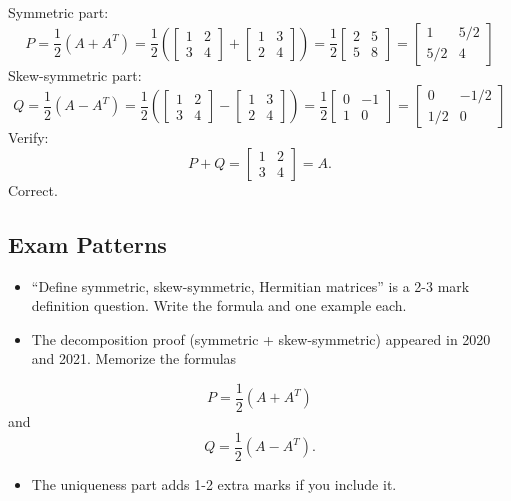 \documentclass[
]{article}
\providecommand{\tightlist}{%
  \setlength{\itemsep}{0pt}\setlength{\parskip}{0pt}}
\begin{document}
Symmetric part:
\[
P = \frac{1}{2}(A + A^T) = \frac{1}{2}\left(
\begin{bmatrix}
1 & 2 \\
3 & 4
\end{bmatrix} + \begin{bmatrix} 1 & 3 \\ 2 & 4 \end{bmatrix}\right) = \frac{1}{2}\begin{bmatrix} 2 & 5 \\ 5 & 8 \end{bmatrix} = \begin{bmatrix} 1 & 5/2 \\ 5/2 & 4 \end{bmatrix}
\]
Skew-symmetric part:
\[
Q = \frac{1}{2}(A - A^T) = \frac{1}{2}\left(
\begin{bmatrix}
1 & 2 \\
3 & 4
\end{bmatrix} - \begin{bmatrix} 1 & 3 \\ 2 & 4 \end{bmatrix}\right) = \frac{1}{2}\begin{bmatrix} 0 & -1 \\ 1 & 0 \end{bmatrix} = \begin{bmatrix} 0 & -1/2 \\ 1/2 & 0 \end{bmatrix}
\]
Verify:
\[
P + Q =
\begin{bmatrix}
1 & 2 \\
3 & 4
\end{bmatrix} = A.
\]
Correct.

\subsection{Exam Patterns}\label{exam-patterns-17}

\begin{itemize}
\tightlist
\item
  ``Define symmetric, skew-symmetric, Hermitian matrices'' is a 2-3 mark
  definition question. Write the formula and one example each.
\item
  The decomposition proof (symmetric + skew-symmetric) appeared in 2020
  and 2021. Memorize the formulas
\end{itemize}
\[
P = \frac{1}{2}(A + A^T)
\]
and
\[
Q = \frac{1}{2}(A - A^T).
\]
\begin{itemize}
\tightlist
\item
  The uniqueness part adds 1-2 extra marks if you include it.
\end{itemize}
\end{document}

